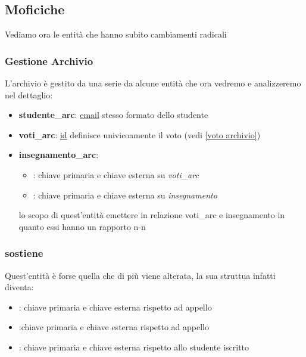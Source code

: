 \subsection{Moficiche}
Vediamo ora le entità che hanno subito cambiamenti radicali
\subsubsection{Gestione Archivio}
L'archivio è gestito da una serie da alcune entità che ora vedremo e analizzeremo nel dettaglio:
\begin{itemize}
    \item \textbf{studente\_arc}: \underline{email} stesso formato dello studente
    \item \textbf{voti\_arc}: \underline{id} definisce univicoamente il voto (vedi \ref{voto archivio})
    \item \textbf{insegnamento\_arc}:
    \begin{itemize}
        \item {}: chiave primaria e chiave esterna su \textit{voti\_arc}
        \item {}: chiave primaria e chiave esterna su \textit{insegnamento}
    \end{itemize}
    lo scopo di quest'entità emettere in relazione voti\_arc e insegnamento  in quanto essi hanno un rapporto n-n
\end{itemize}
\subsubsection{sostiene}
Quest'entità è forse quella che di più viene alterata, la sua struttua infatti diventa:
\begin{itemize}
    \item {}: chiave primaria e chiave esterna rispetto ad appello 
    \item {}:chiave primaria e chiave esterna rispetto ad appello 
    \item {}: chiave primaria e chiave esterna rispetto allo studente iscritto
\end{itemize}